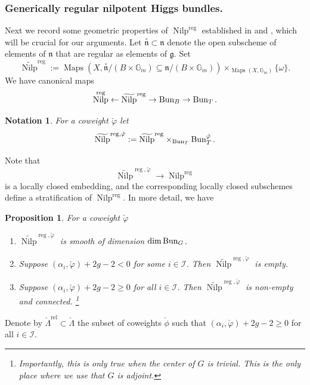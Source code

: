 \documentclass[9pt]{amsart}
\DeclareMathOperator{\reg}{{reg}}
\newcommand{\bG}{{\mathbb G}}
\newcommand{\cI}{{\mathcal I}}
\DeclareMathOperator{\Maps}{{Maps}}
\DeclareMathOperator{\Nilp}{{Nilp}} \DeclareMathOperator{\op}{{op}}
\newtheorem{pr}[subsubsection]{Proposition}
\newtheorem{ntn}[subsubsection]{Notation}
\numberwithin{equation}{section}
\begin{document}
	\subsubsection{Generically regular nilpotent Higgs bundles.} Next we record some geometric properties of $\Nilp^{\reg}$ established in \cite{BD} and \cite[2.5]{FR}, which will be crucial for our arguments. Let $\stackrel{\circ}{\mathfrak{n}} \subset \mathfrak{n}$ denote the open subscheme of elements of $\mathfrak{n}$ that are regular as elements of $\mathfrak{g}$. Set 
	$$\widetilde{\Nilp}^{\reg} := \Maps(X, \stackrel{\circ}{\mathfrak{n}}/(B \times \bG_m) \subseteq \mathfrak{n}/(B \times \bG_m)) \times_{\Maps(X,\bG_m)} \{\omega\}.$$
	We have canonical maps 
	$$\Nilp^{\reg} \leftarrow \widetilde{\Nilp}^{\reg} \rightarrow \Bun_B \rightarrow \Bun_T.$$
	\begin{ntn}
		For a coweight $\check{\varphi}$ let $$\widetilde{\Nilp}^{\reg, \check{\varphi}}:= \widetilde{\Nilp}^{\reg} \times_{\Bun_T} \Bun_T^{\check{\varphi}}.$$ 
	\end{ntn}
	Note that $$\widetilde{\Nilp}^{\reg, \check{\varphi}} \rightarrow \Nilp^{\reg}$$ is a locally closed embedding, and the corresponding locally closed subschemes define a stratification of $\Nilp^{\reg}$. In more detail, we have 
	\begin{pr}\cite[Prposition 2.5.4.1]{FR}\label{2.5.4.1} For a coweight $\check{\varphi}$
		\begin{enumerate}
			\item $\widetilde{\Nilp}^{\reg, \check{\varphi}}$ is smooth of dimension $\dim \operatorname{{Bun}}_G$. 
			\item Suppose $(\alpha_i,\check{\varphi}) + 2g - 2 < 0$ for some $i \in \cI$. Then $\widetilde{\Nilp}^{\reg, \check{\varphi}}$ is empty.
			\item Suppose $(\alpha_i,\check{\varphi})+ 2g - 2 \geq 0$ for all $i \in \cI$. Then $\widetilde{\Nilp}^{\reg, \check{\varphi}}$ is non-empty and connected. \footnote{Importantly, this is only true when the center of $G$ is trivial. This is the only place where we use that $G$ is adjoint.}
		\end{enumerate}
	\end{pr}
	Denote by $\check{\Lambda}^{\operatorname{rel}} \subset \check{\Lambda}$ the subset of coweights $\check{\phi}$ such that $(\alpha_i,\check{\varphi})+ 2g - 2 \geq 0$ for all $i \in \cI$.
	
	
	
	
\end{document}
